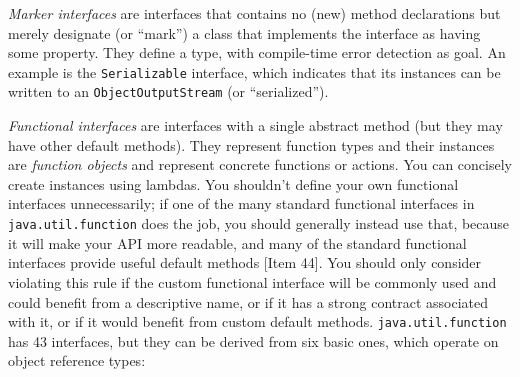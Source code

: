 \documentclass[8pt, table, xcdraw]{article}%
\begin{document}
\emph{Marker interfaces} are interfaces that contains no (new) method declarations but merely designate (or “mark”) a class that implements the interface as having some property. They define a type, with compile-time error detection as goal. An example is the \lstinline{Serializable} interface, which indicates that its instances can be written to an \lstinline{ObjectOutputStream} (or “serialized”).

\emph{Functional interfaces} are interfaces with a single abstract method (but they may have other default methods). They represent function types and their instances are \emph{function objects} and represent concrete functions or actions. You can concisely create instances using lambdas. You shouldn't define your own functional interfaces unnecessarily; if one of the many standard functional interfaces in \lstinline{java.util.function} does the job, you should generally instead use that, because it will make your API more readable, and many of the standard functional interfaces provide useful default methods [Item 44]. You should only consider violating this rule if the custom functional interface will be commonly used and could benefit from a descriptive name, or if it has a strong contract associated with it, or if it would benefit from custom default methods. \lstinline{java.util.function} has 43 interfaces, but they can be derived from six basic ones, which operate on object reference types:

\begin{table}[H]
\centering
{}
\end{table}
\end{document}
